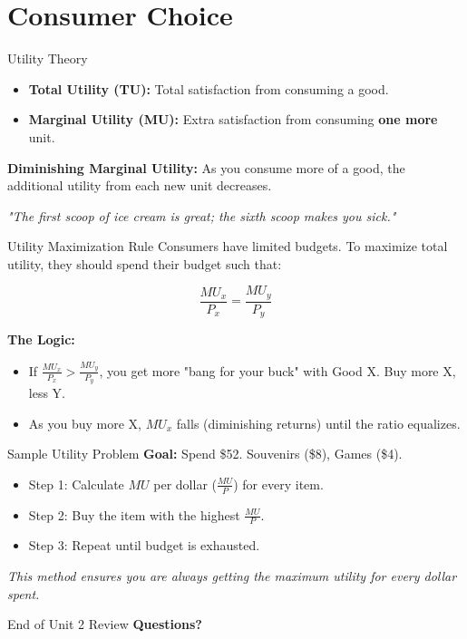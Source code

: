 \documentclass[aspectratio=169]{beamer}
\begin{document}
\section{Consumer Choice}

\begin{frame}{Utility Theory}
    \begin{itemize}
        \item \textbf{Total Utility (TU):} Total satisfaction from consuming a good.
        \item \textbf{Marginal Utility (MU):} Extra satisfaction from consuming \textbf{one more} unit.
    \end{itemize}
    
    \textbf{Diminishing Marginal Utility:}
    As you consume more of a good, the additional utility from each new unit decreases.
    \begin{center}
        \textit{"The first scoop of ice cream is great; the sixth scoop makes you sick."}
    \end{center}
\end{frame}

\begin{frame}{Utility Maximization Rule}
    Consumers have limited budgets. To maximize total utility, they should spend their budget such that:
    
    \[ \frac{MU_x}{P_x} = \frac{MU_y}{P_y} \]
    
    \textbf{The Logic:}
    \begin{itemize}
        \item If $\frac{MU_x}{P_x} > \frac{MU_y}{P_y}$, you get more "bang for your buck" with Good X. Buy more X, less Y.
        \item As you buy more X, $MU_x$ falls (diminishing returns) until the ratio equalizes.
    \end{itemize}
\end{frame}

\begin{frame}{Sample Utility Problem}
    \textbf{Goal:} Spend \$52. Souvenirs (\$8), Games (\$4).
    
    \begin{itemize}
        \item Step 1: Calculate $MU$ per dollar ($\frac{MU}{P}$) for every item.
        \item Step 2: Buy the item with the highest $\frac{MU}{P}$.
        \item Step 3: Repeat until budget is exhausted.
    \end{itemize}
    \vspace{0.5cm}
    \textit{This method ensures you are always getting the maximum utility for every dollar spent.}
\end{frame}

\begin{frame}{End of Unit 2 Review}
    \centering
    \Large \textbf{Questions?}
\end{frame}
\end{document}
